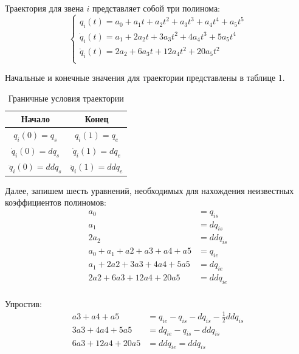 \documentclass[a4paper,14pt]{extreport}
\begin{document}
Траектория для звена $i$ представляет собой три полинома:
\begin{equation*}
\begin{cases}
q_i(t) = a_0 + a_1  t + a_2  t^2 + a_3 t^3 + a_4 t^4 + a_5 t^5\\
\dot q_i(t) = a_1 + 2 a_2  t + 3 a_3 t^2 + 4 a_4 t^3 + 5 a_5 t^4\\
\ddot q_i(t) = 2 a_2 + 6 a_3 t + 12 a_4 t^2 + 20 a_5 t^2\\
\end{cases}
\end{equation*}

Начальные и конечные значения для траектории представлены в таблице 1. 

\begin{table}[H]
	\centering
	\caption{Граничные условия траектории}
	\label{my-label}
	\begin{tabular}{|c|c|}
		\hline
		Начало         & Конец          \\ \hline
		$q_i(0) = q_s$    & $q_i(1) = q_e $   \\ \hline
		$	\dot q_i(0) = dq_s $ &$ \dot q_i(1) = dq_e $ \\ \hline
		$	\ddot q_i(0) = ddq_s$ & $\ddot q_i(1) = ddq_e$ \\ \hline
	\end{tabular}
\end{table}


Далее, запишем шесть уравнений, необходимых для нахождения неизвестных коэффициентов полиномов:
\begin{align*}
a_0&= q_{is}\\
a_1&= dq_{is}\\
2 a_2&= ddq_{is}\\
a_0 + a_1 + a2 + a3 + a4 + a5 &= q_{ie}\\
a_1 + 2 a2 + 3 a3 + 4 a4 + 5 a5&= dq_{ie}\\
2 a2 + 6 a3 + 12 a4 + 20 a5&= ddq_{ie}\\
\end{align*}

Упростив:
\begin{align*}
a3 + a4 + a5 &= q_{ie} - q_{is} - dq_{is} - \frac{1}{2} ddq_{is}\\
3 a3 + 4 a4 + 5 a5&= dq_{ie} - q_{is} - ddq_{is}\\
6 a3 + 12 a4 + 20 a5&= ddq_{ie} = ddq_{is}\\
\end{align*}
\end{document}
